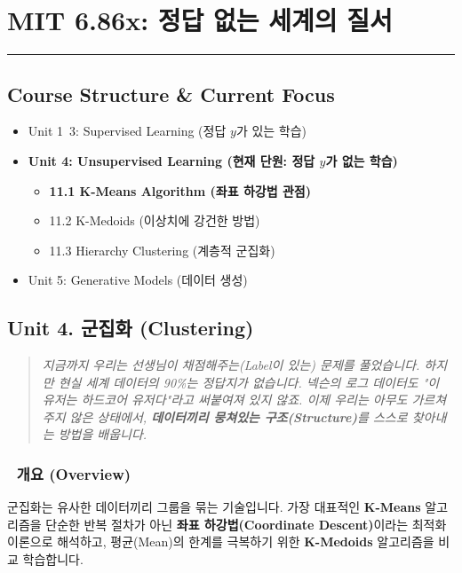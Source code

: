 \documentclass[11pt,a4paper]{book}
\theoremstyle{definition}
\begin{document}
\chapter{MIT 6.86x: 정답 없는 세계의 질서}
\label{ch:lecture11}


\vspace{1cm}
\hrule
\vspace{1cm}

\section*{Course Structure \& Current Focus}
\begin{itemize}
    \item Unit 1~3: Supervised Learning (정답 $y$가 있는 학습)
    \item \textbf{\textcolor{mainblue}{Unit 4: Unsupervised Learning (현재 단원: 정답 $y$가 없는 학습)}}
    \begin{itemize}
        \item \textbf{11.1 K-Means Algorithm (좌표 하강법 관점)}
        \item 11.2 K-Medoids (이상치에 강건한 방법)
        \item 11.3 Hierarchy Clustering (계층적 군집화)
    \end{itemize}
    \item Unit 5: Generative Models (데이터 생성)
\end{itemize}


\section{Unit 4. 군집화 (Clustering)}

\begin{quote}
\textit{지금까지 우리는 선생님이 채점해주는(Label이 있는) 문제를 풀었습니다. 하지만 현실 세계 데이터의 90\%는 정답지가 없습니다. 넥슨의 로그 데이터도 "이 유저는 하드코어 유저다"라고 써붙여져 있지 않죠. 이제 우리는 아무도 가르쳐주지 않은 상태에서, \textbf{데이터끼리 뭉쳐있는 구조(Structure)}를 스스로 찾아내는 방법을 배웁니다.}
\end{quote}

\subsection*{📌 개요 (Overview)}
군집화는 유사한 데이터끼리 그룹을 묶는 기술입니다. 가장 대표적인 \textbf{K-Means} 알고리즘을 단순한 반복 절차가 아닌 \textbf{좌표 하강법(Coordinate Descent)}이라는 최적화 이론으로 해석하고, 평균(Mean)의 한계를 극복하기 위한 \textbf{K-Medoids} 알고리즘을 비교 학습합니다.
\end{document}
